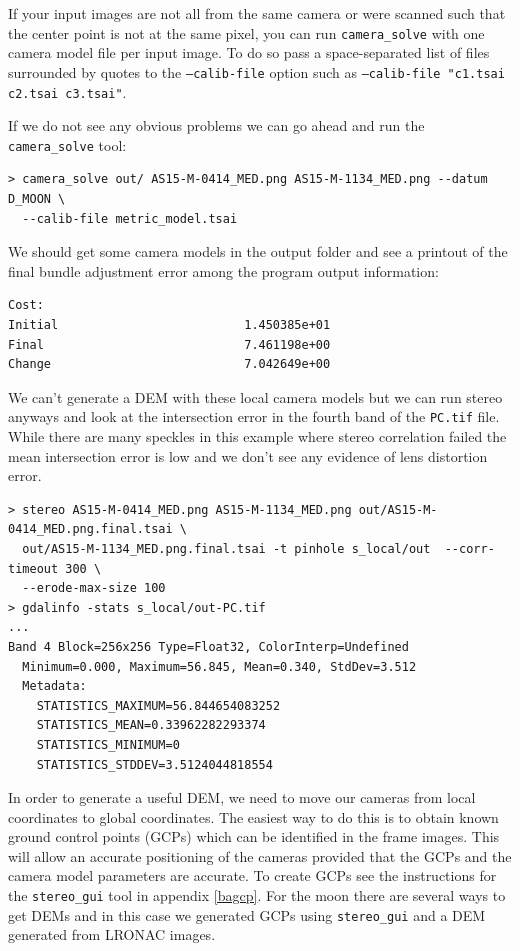 If your input images are not all from the same camera or were scanned such that the center
point is not at the same pixel, you can run \texttt{camera\_solve} with one camera
model file per input image.  To do so pass a space-separated list of files 
surrounded by quotes to the \texttt{--calib-file} option such as 
\texttt{--calib-file "c1.tsai c2.tsai c3.tsai"}.

If we do not see any obvious problems we can go ahead and run the \texttt{camera\_solve} tool:
\begin{verbatim}
> camera_solve out/ AS15-M-0414_MED.png AS15-M-1134_MED.png --datum D_MOON \
  --calib-file metric_model.tsai
\end{verbatim}

We should get some camera models in the output folder and see a printout of
the final bundle adjustment error among the program output information:
\begin{verbatim}
Cost:
Initial                          1.450385e+01
Final                            7.461198e+00
Change                           7.042649e+00
\end{verbatim}

We can't generate a DEM with these local camera models but we can run stereo anyways
and look at the intersection error in the fourth band of the \texttt{PC.tif} file.  While
there are many speckles in this example where stereo correlation failed the mean
intersection error is low and we don't see any evidence of lens distortion error.

\begin{verbatim}
> stereo AS15-M-0414_MED.png AS15-M-1134_MED.png out/AS15-M-0414_MED.png.final.tsai \
  out/AS15-M-1134_MED.png.final.tsai -t pinhole s_local/out  --corr-timeout 300 \
  --erode-max-size 100
> gdalinfo -stats s_local/out-PC.tif
...
Band 4 Block=256x256 Type=Float32, ColorInterp=Undefined
  Minimum=0.000, Maximum=56.845, Mean=0.340, StdDev=3.512
  Metadata:
    STATISTICS_MAXIMUM=56.844654083252
    STATISTICS_MEAN=0.33962282293374
    STATISTICS_MINIMUM=0
    STATISTICS_STDDEV=3.5124044818554
\end{verbatim}

In order to generate a useful DEM, we need to move our cameras from local coordinates
to global coordinates.  The easiest way to do this is to obtain known ground control
points (GCPs) which can be identified in the frame images.  This will allow an accurate
positioning of the cameras provided that the GCPs and the camera model parameters are
accurate.  To create GCPs see the instructions for the \texttt{stereo\_gui} tool in
appendix \ref{bagcp}.
For the moon there are several ways to get DEMs and in this case we generated GCPs
using \texttt{stereo\_gui} and a DEM generated from LRONAC images.

